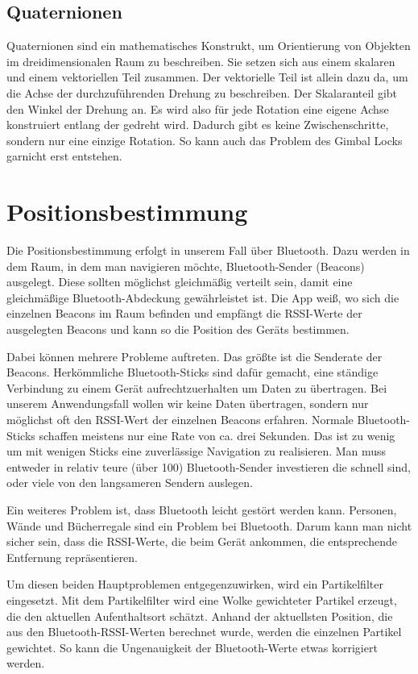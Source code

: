 \subsection{Quaternionen}
Quaternionen sind ein mathematisches Konstrukt, um Orientierung von Objekten im dreidimensionalen Raum zu beschreiben. Sie setzen sich aus einem skalaren und einem vektoriellen Teil zusammen. Der vektorielle Teil ist allein dazu da, um die Achse der durchzuführenden Drehung zu beschreiben. Der Skalaranteil gibt den Winkel der Drehung an. Es wird also für jede Rotation eine eigene Achse konstruiert entlang der gedreht wird. Dadurch gibt es keine Zwischenschritte, sondern nur eine einzige Rotation. So kann auch das Problem des Gimbal Locks garnicht erst entstehen.

\section{Positionsbestimmung}
Die Positionsbestimmung erfolgt in unserem Fall über Bluetooth. Dazu werden in dem Raum, in dem man navigieren möchte, Bluetooth-Sender (Beacons) ausgelegt. Diese sollten möglichst gleichmäßig verteilt sein, damit eine gleichmäßige Bluetooth-Abdeckung gewährleistet ist. Die App weiß, wo sich die einzelnen Beacons im Raum befinden und empfängt die RSSI-Werte der ausgelegten Beacons und kann so die Position des Geräts bestimmen. 

Dabei können mehrere Probleme auftreten. Das größte ist die Senderate der Beacons. Herkömmliche Bluetooth-Sticks sind dafür gemacht, eine ständige Verbindung zu einem Gerät aufrechtzuerhalten um Daten zu übertragen. Bei unserem Anwendungsfall wollen wir keine Daten übertragen, sondern nur möglichst oft den RSSI-Wert der einzelnen Beacons erfahren. Normale Bluetooth-Sticks schaffen meistens nur eine Rate von ca. drei Sekunden. Das ist zu wenig um mit wenigen Sticks eine zuverlässige Navigation zu realisieren. Man muss entweder in relativ teure (über 100\texteuro) Bluetooth-Sender investieren die schnell sind, oder viele von den langsameren Sendern auslegen.

Ein weiteres Problem ist, dass Bluetooth leicht gestört werden kann. Personen, Wände und Bücherregale sind ein Problem bei Bluetooth. Darum kann man nicht sicher sein, dass die RSSI-Werte, die beim Gerät ankommen, die entsprechende Entfernung repräsentieren. 

Um diesen beiden Hauptproblemen entgegenzuwirken, wird ein Partikelfilter eingesetzt. Mit dem Partikelfilter wird eine Wolke gewichteter Partikel erzeugt, die den aktuellen Aufenthaltsort schätzt. Anhand der aktuellsten Position, die aus den Bluetooth-RSSI-Werten berechnet wurde, werden die einzelnen Partikel gewichtet. So kann die Ungenauigkeit der Bluetooth-Werte etwas korrigiert werden. \cite{wiki:001}